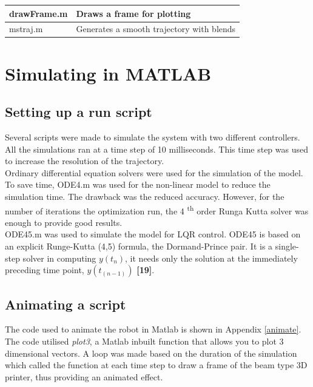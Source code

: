 \documentclass{UoNMCHA}
\numberwithin{equation}{section}
\begin{document}
\begin{table}[H]
\begin{centering}
\begin{tabular}{ll}
				drawFrame.m                 & Draws a frame for plotting                                                                                                     \\ \hline
				mstraj.m                    & Generates a smooth trajectory with blends \\ \hline                                                                                      
			\end{tabular}
		\end{centering}
	\end{table}
	
	\section{Simulating in MATLAB}
	
	\subsection*{Setting up a run script}
	
	Several scripts were made to simulate the system with two different controllers. All the simulations ran at a time step of 10 milliseconds. This time step was used to increase the resolution of the trajectory. \\
	
	Ordinary differential equation solvers were used for the simulation of the model. To save time, ODE4.m was used for the non-linear model to reduce the simulation time. The drawback was the reduced accuracy. However, for the number of iterations the optimization run, the 4 \textsuperscript{th} order Runga Kutta solver was enough to provide good results. \\
	ODE45.m was used to simulate the model for LQR control. ODE45 is based on an explicit Runge-Kutta (4,5) formula, the Dormand-Prince pair. It is a single-step solver in computing $y(t_n )$, it needs only the solution at the immediately preceding time point, $y(t_{(n-1)} )$ \textbf{[19]}. \\
	\subsection*{Animating a script}
	
	The code used to animate the robot in Matlab is shown in Appendix \ref{animate}.\\
	The code utilised \textit{plot3}, a Matlab inbuilt function that allows you to plot 3 dimensional vectors. A loop was made based on the duration of the simulation which called the function at each time step to draw a frame of the beam type 3D printer, thus providing an animated effect.
	
\end{document}
